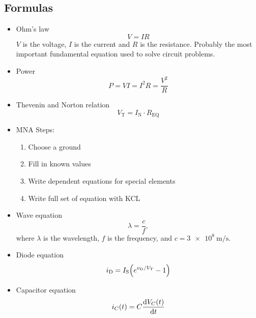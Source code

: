 \subsection*{Formulas}
\begin{itemize}
  \item Ohm's law
  \begin{equation}
    V = IR
    \label{eq:vir}
  \end{equation}
  $V$ is the voltage, $I$ is the current and $R$ is the resistance. Probably
  the most important fundamental equation used to solve circuit problems.

  \item Power
  \begin{equation}
    P = VI = I^2R = \frac{V^2}{R}
  \end{equation}

  \item Thevenin and Norton relation
  \begin{equation}
    V_\text{T} = I_\text{N} \cdot R_\text{EQ}
    \label{eq:thev_nort}
  \end{equation}

  \item MNA Steps:
  \begin{enumerate}
    \item Choose a ground 
    \item Fill in known values 
    \item Write dependent equations for special elements
    \item Write full set of equation with KCL
  \end{enumerate}

  \item Wave equation
  \begin{equation}
    \lambda = \frac{c}{f},
    \label{eq:wave_eq}
  \end{equation}
  where $\lambda$ is the wavelength, $f$ is the frequency,
  and $c = \SI{3e8}{\m/\s}$.

  \item Diode equation
  \begin{equation}
    \iD = \IS \pa{e^{\vD/\VT} - 1}
    \label{eq:diode_eq}
  \end{equation}

  \item Capacitor equation
  \begin{equation}
    i_C(t) = C \dv{V_C(t)}{t}
    \label{eq:cap}
  \end{equation}


\end{itemize}
